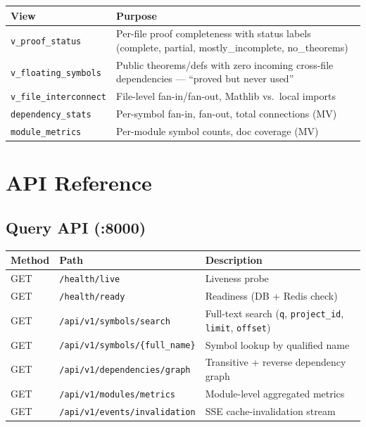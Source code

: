 \documentclass[11pt,a4paper]{article}
\begin{document}
\begin{tabular}{@{}lp{9cm}@{}}
\toprule
\textbf{View} & \textbf{Purpose} \\
\midrule
\texttt{v\_proof\_status}      & Per-file proof completeness with status labels
                                 (complete, partial, mostly\_incomplete, no\_theorems) \\
\texttt{v\_floating\_symbols}  & Public theorems/defs with zero incoming cross-file
                                 dependencies --- ``proved but never used'' \\
\texttt{v\_file\_interconnect} & File-level fan-in/fan-out, Mathlib vs.\ local imports \\
\texttt{dependency\_stats}     & Per-symbol fan-in, fan-out, total connections (MV) \\
\texttt{module\_metrics}       & Per-module symbol counts, doc coverage (MV) \\
\bottomrule
\end{tabular}

\section{API Reference}

\subsection{Query API (:8000)}

\begin{longtable}{@{}llp{7.5cm}@{}}
\toprule
\textbf{Method} & \textbf{Path} & \textbf{Description} \\
\midrule
\endhead
GET & \texttt{/health/live}                    & Liveness probe \\
GET & \texttt{/health/ready}                   & Readiness (DB + Redis check) \\
GET & \texttt{/api/v1/symbols/search}          & Full-text search (\texttt{q}, \texttt{project\_id},
                                                  \texttt{limit}, \texttt{offset}) \\
GET & \texttt{/api/v1/symbols/\{full\_name\}}  & Symbol lookup by qualified name \\
GET & \texttt{/api/v1/dependencies/graph}       & Transitive + reverse dependency graph \\
GET & \texttt{/api/v1/modules/metrics}          & Module-level aggregated metrics \\
GET & \texttt{/api/v1/events/invalidation}      & SSE cache-invalidation stream \\
\bottomrule
\end{longtable}
\end{document}
